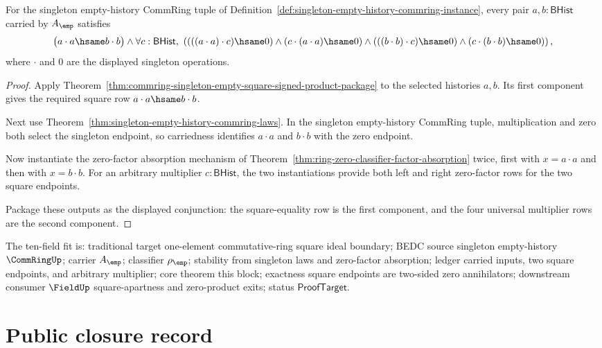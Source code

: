 \begin{theorem}
\label{thm:commring-singleton-empty-square-endpoint-annihilator-package}
For the singleton empty-history CommRing tuple of
Definition~\ref{def:singleton-empty-history-commring-instance}, every pair
$a,b:\mathsf{BHist}$ carried by $A_{\emp}$ satisfies
$$
\bigl(a\cdot a\hsame b\cdot b\bigr)
\land
\forall c:\mathsf{BHist},\
\left(
(((a\cdot a)\cdot c)\hsame0)
\land
(c\cdot(a\cdot a)\hsame0)
\land
(((b\cdot b)\cdot c)\hsame0)
\land
(c\cdot(b\cdot b)\hsame0)
\right),
$$
where $\cdot$ and $0$ are the displayed singleton operations.
\end{theorem}
\begin{proof}
Apply
Theorem~\ref{thm:commring-singleton-empty-square-signed-product-package} to the
selected histories $a,b$. Its first component gives the required square row
$a\cdot a\hsame b\cdot b$.

Next use Theorem~\ref{thm:singleton-empty-history-commring-laws}. In the
singleton empty-history CommRing tuple, multiplication and zero both select the
singleton endpoint, so carriedness identifies $a\cdot a$ and $b\cdot b$ with
the zero endpoint.

Now instantiate the zero-factor absorption mechanism of
Theorem~\ref{thm:ring-zero-classifier-factor-absorption} twice, first with
$x=a\cdot a$ and then with $x=b\cdot b$. For an arbitrary multiplier
$c:\mathsf{BHist}$, the two instantiations provide both left and right
zero-factor rows for the two square endpoints.

Package these outputs as the displayed conjunction: the square-equality row is
the first component, and the four universal multiplier rows are the second
component.
\end{proof}

The ten-field fit is: traditional target one-element commutative-ring square
ideal boundary; BEDC source singleton empty-history $\CommRingUp$; carrier
$A_{\emp}$; classifier $\rho_{\emp}$; stability from singleton laws and
zero-factor absorption; ledger carried inputs, two square endpoints, and
arbitrary multiplier; core theorem this block; exactness square endpoints are
two-sided zero annihilators; downstream consumer $\FieldUp$ square-apartness and
zero-product exits; status $\mathsf{ProofTarget}$.

\section{Public closure record}\label{sec:commring-public-closure-record}

